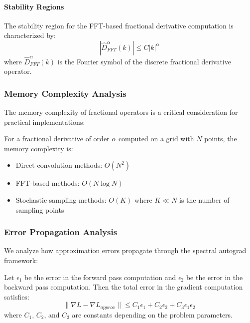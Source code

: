 \paragraph{Stability Regions}

The stability region for the FFT-based fractional derivative computation is characterized by:
\begin{equation}
|\hat{D}^{\alpha}_{FFT}(k)| \leq C |k|^{\alpha}
\end{equation}
where $\hat{D}^{\alpha}_{FFT}(k)$ is the Fourier symbol of the discrete fractional derivative operator.

\subsubsection{Memory Complexity Analysis}

The memory complexity of fractional operators is a critical consideration for practical implementations:

\begin{theorem}
For a fractional derivative of order $\alpha$ computed on a grid with $N$ points, the memory complexity is:
\begin{itemize}
\item Direct convolution methods: $O(N^2)$
\item FFT-based methods: $O(N \log N)$
\item Stochastic sampling methods: $O(K)$ where $K \ll N$ is the number of sampling points
\end{itemize}
\end{theorem}

\subsubsection{Error Propagation Analysis}

We analyze how approximation errors propagate through the spectral autograd framework:

\begin{theorem}
Let $\epsilon_1$ be the error in the forward pass computation and $\epsilon_2$ be the error in the backward pass computation. Then the total error in the gradient computation satisfies:
\begin{equation}
\|\nabla L - \nabla L_{approx}\| \leq C_1 \epsilon_1 + C_2 \epsilon_2 + C_3 \epsilon_1 \epsilon_2
\end{equation}
where $C_1$, $C_2$, and $C_3$ are constants depending on the problem parameters.
\end{theorem}

